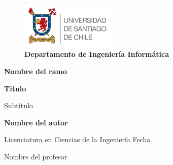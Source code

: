 \begin{titlepage}
  \begin{center}

    \begin{figure}
      \centering
      \includegraphics[width=0.4\textwidth]{imagenes/logo_usach.png}
      \caption*{\bf Departamento de Ingeniería Informática}
    \end{figure}

    {\large \bf Nombre del ramo}

    \vspace{4.5cm}
    \huge
    \textbf{Titulo}

    \vspace{0.5cm}
    \large
    {Subtitulo}

    \vspace{0.8cm}
    \textbf{Nombre del autor}

    \vfill

  \end{center}

  Licenciatura en Ciencias de la Ingeniería \hfill Fecha

  \hfill Nombre del profesor
\end{titlepage}